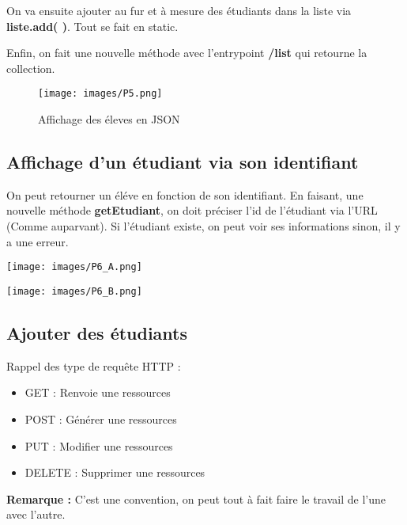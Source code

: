 \documentclass{rapport}
\begin{document}
On va ensuite ajouter au fur et à mesure des étudiants dans la liste via \textbf{liste.add( )}. Tout se fait en static.

Enfin, on fait une nouvelle méthode avec l'entrypoint \textbf{/list} qui retourne la collection. 


\begin{figure}[H]
	\centering
    \texttt{[image: images/P5.png]}
    \caption{Affichage des éleves en JSON}
\end{figure}


\subsection{Affichage d'un étudiant via son identifiant}
On peut retourner un éléve en fonction de son identifiant. En faisant, une nouvelle méthode \textbf{getEtudiant}, on doit préciser l'id de l'étudiant via l'URL (Comme auparvant). Si l'étudiant existe, on peut voir ses informations sinon, il y a une erreur.



\begin{minipage}{0.5\textwidth}
\texttt{[image: images/P6\_A.png]}
\label{fig:figure}
\end{minipage}
\hspace{1cm}
\begin{minipage}{0.5\textwidth}
\texttt{[image: images/P6\_B.png]}
\label{fig:figure}
\vspace{1cm}
\end{minipage}

\subsection{Ajouter des étudiants}

Rappel des type de requête HTTP : 
\begin{itemize}
	\item GET : Renvoie une ressources
	\item POST : Générer une ressources
	\item PUT : Modifier une ressources 
	\item DELETE : Supprimer une ressources
\end{itemize}

\textbf{Remarque :} C'est une convention, on peut tout à fait faire le travail de l'une avec l'autre.\newline
\end{document}
